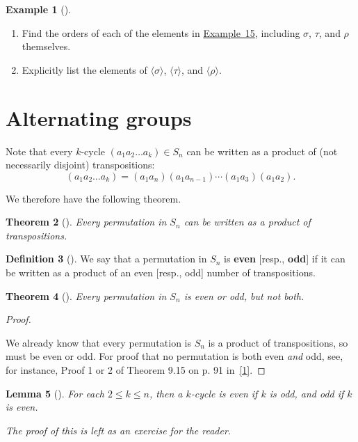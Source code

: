 \documentclass[10pt,]{book}
\newcommand{\terminology}[1]{\textbf{#1}}
\theoremstyle{plain}
\newtheorem{theorem}{Theorem}[section]
\newtheorem{lemma}[theorem]{Lemma}
\theoremstyle{definition}
\newtheorem{definition}[theorem]{Definition}
\theoremstyle{definition}
\theoremstyle{definition}
\newtheorem{example}[theorem]{Example}
\theoremstyle{definition}
\numberwithin{equation}{section}
\begin{document}
\begin{example}[]\label{example-57}
\leavevmode%
\begin{enumerate}
\item\hypertarget{li-341}{}Find the orders of each of the elements in \hyperref[s9ex]{Example~15}, including \(\sigma\), \(\tau\), and \(\rho\) themselves.%
\item\hypertarget{li-342}{}Explicitly list the elements of \(\langle \sigma\rangle\), \(\langle \tau\rangle\), and \(\langle \rho\rangle\).%
\end{enumerate}
\end{example}
\typeout{************************************************}
\typeout{************************************************}
\section[{Alternating groups}]{Alternating groups}\label{section-19}
Note that every \(k\)-cycle \((a_1a_2\ldots a_k)\in S_n\) can be written as a product of (not necessarily disjoint) transpositions:%
\begin{equation*}
(a_1a_2\ldots a_k)=(a_1a_n)(a_1a_{n-1})\cdots(a_1a_3)(a_1a_2).
\end{equation*}
%
\par
We therefore have the following theorem.%
\begin{theorem}[{}]\label{theorem-34}
Every permutation in \(S_n\) can be written as a product of transpositions.%
\end{theorem}
\begin{definition}[{}]\label{definition-50}
We say that a permutation in \(S_n\) is \terminology{even} [resp., \terminology{odd}] if it can be written as a product of an even [resp., odd] number of transpositions.%
\end{definition}
\begin{theorem}[{}]\label{theorem-35}
Every permutation in \(S_n\) is even or odd, but not both.%
\end{theorem}
\begin{proof}\hypertarget{proof-28}{}
We already know that every permutation is \(S_n\) is a product of transpositions, so must be even or odd. For proof that no permutation is both even \emph{and} odd, see, for instance, Proof 1 or 2 of Theorem 9.15 on p. 91 in~\hyperlink{F}{[1]}.%
\end{proof}
\begin{lemma}[{}]\label{evenodd}
For each \(2\leq k\leq n\), then a \(k\)-cycle is even if \(k\) is odd, and odd if \(k\) is even.%
\par
The proof of this is left as an exercise for the reader.%
\end{lemma}
\end{document}
